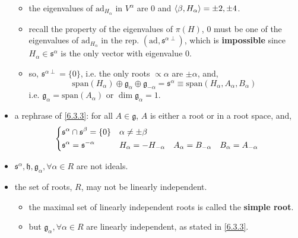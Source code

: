 \begin{itemize}
\begin{tcolorbox}[title=proof:]
\begin{itemize}
			\item the eigenvalues of $\mathrm{ad}_{H_\alpha}$ in $V^\alpha$ are $0$ and $\braket{\beta, H_\alpha} = \pm 2, \pm 4$.
			
			\item recall the property of the eigenvalues of $\pi(H)$, $0$ must be one of the eigenvalues of $\mathrm{ad}_{H_\alpha}$ in the rep. $(\mathrm{ad}, \mathfrak{s}^{\alpha \perp})$, which is \textbf{impossible} since $H_\alpha \in \mathfrak{s}^\alpha$ is the only vector with eigenvalue $0$.
			
			\item so, $\mathfrak{s}^{\alpha \perp} = \{0\}$, i.e. the only roots $\propto \alpha$ are $\pm \alpha$, and,
			\begin{equation}
				\mathrm{span}(H_\alpha) \oplus \mathfrak{g}_\alpha \oplus \mathfrak{g}_{- \alpha} = \mathfrak{s}^\alpha \equiv \mathrm{span}(H_\alpha, A_\alpha, B_\alpha)
			\end{equation}
			i.e. $\mathfrak{g}_\alpha = \mathrm{span}(A_\alpha)$ or $\dim \mathfrak{g}_\alpha = 1$.
		\end{itemize}
	\end{tcolorbox}
	
	\item a rephrase of \eqref{6.3.3}: for all $A \in \mathfrak{g}$, $A$ is either a root or in a root space, and,
	\begin{equation}
		\begin{dcases}
			\mathfrak{s}^\alpha \cap \mathfrak{s}^\beta = \{0\} & \alpha \neq \pm \beta \\
			\mathfrak{s}^\alpha = \mathfrak{s}^{- \alpha} & H_\alpha = - H_{- \alpha} \quad A_\alpha = B_{- \alpha} \quad B_\alpha = A_{- \alpha}
		\end{dcases}
	\end{equation}
	
	\item $\mathfrak{s}^\alpha, \mathfrak{h}, \mathfrak{g}_\alpha, \forall \alpha \in R$ are not ideals.
	
	\item the set of roots, $R$, may not be linearly independent.
	\begin{itemize}
		\item the maximal set of linearly independent roots is called the \textbf{simple root}.
		
		\item but $\mathfrak{g}_\alpha, \forall \alpha \in R$ are linearly independent, as stated in \eqref{6.3.3}.
	\end{itemize}
\end{itemize}

